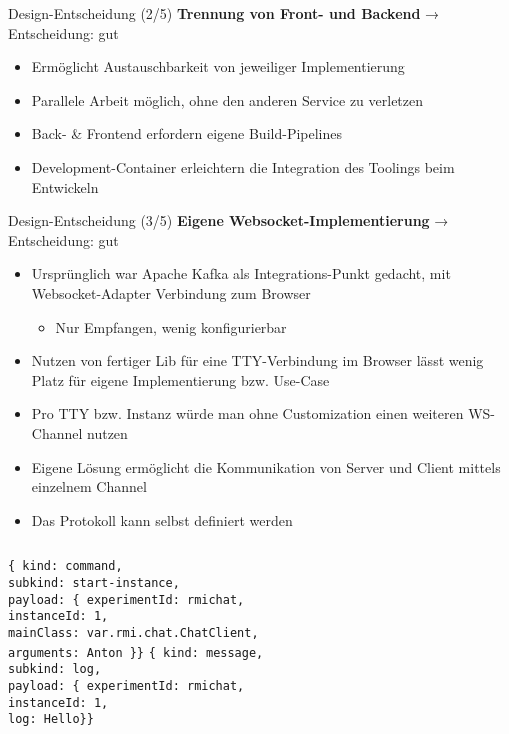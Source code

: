 \documentclass[compress]{beamer}
\begin{document}
\begin{frame}{Design-Entscheidung (2/5)}
  \textbf{Trennung von Front- und Backend}
  \hfill
  → Entscheidung: {\color{green} gut}
  \begin{itemize}
    \item Ermöglicht Austauschbarkeit von jeweiliger Implementierung
    \item Parallele Arbeit möglich, ohne den anderen Service zu verletzen
    \item Back- \& Frontend erfordern eigene Build-Pipelines
    \item Development-Container erleichtern die Integration des Toolings beim Entwickeln
  \end{itemize}
\end{frame}

\begin{frame}{Design-Entscheidung (3/5)}
  \textbf{Eigene Websocket-Implementierung}
  \hfill
  → Entscheidung: {\color{green} gut}
  \begin{itemize}
    \item Ursprünglich war Apache Kafka als Integrations-Punkt gedacht, mit Websocket-Adapter Verbindung zum Browser
      \begin{itemize}
    \item Nur Empfangen, wenig konfigurierbar
  \end{itemize}
    \item Nutzen von fertiger Lib für eine TTY-Verbindung im Browser lässt wenig Platz für eigene Implementierung bzw. Use-Case
    \item Pro TTY bzw. Instanz würde man ohne Customization einen weiteren WS-Channel nutzen
    \item Eigene Lösung ermöglicht die Kommunikation von Server und Client mittels einzelnem Channel
    \item Das Protokoll kann selbst definiert werden
  \end{itemize}
  \vspace*{.1cm}
  \begin{columns}[t]
    \texttt{\tiny\{ kind: command, \\ subkind: start-instance,
      \\ payload: \{ experimentId: rmichat, \\\hspace*{1cm}instanceId: 1, \\\hspace*{1cm}mainClass: var.rmi.chat.ChatClient, \\\hspace*{1cm}arguments: Anton \}\}}
    \texttt{\tiny\{ kind: message, \\subkind: log,
      \\ payload: \{ experimentId: rmichat, \\\hspace*{1cm}instanceId: 1, \\\hspace*{1cm}log: Hello\}\}}
  \end{columns}
\end{frame}
\end{document}
